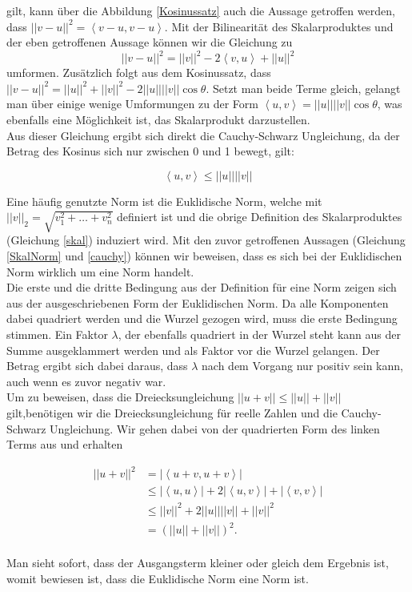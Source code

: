 gilt, kann über die Abbildung \ref{Kosinussatz} auch die Aussage getroffen werden, dass $||v-u||^2 = \left\langle v-u,v-u\right\rangle $. Mit der Bilinearität des Skalarproduktes und der eben getroffenen Aussage können wir die Gleichung zu 
\begin{equation*}
||v-u||^2 = ||v||^2 - 2\left\langle v,u\right\rangle  + ||u||^2 
\end{equation*}
umformen.
Zusätzlich folgt aus dem Kosinussatz, dass $||v-u||^2 = ||u||^2 + ||v||^2 - 2 ||u|| ||v|| \cos\theta$. Setzt man beide Terme gleich, gelangt man über einige wenige Umformungen zu der Form $\left\langle u,v\right\rangle  = ||u|| ||v|| \cos\theta$, was ebenfalls eine Möglichkeit ist, das Skalarprodukt darzustellen.\\
Aus dieser Gleichung ergibt sich direkt die Cauchy-Schwarz Ungleichung, da der Betrag des Kosinus sich nur zwischen 0 und 1 bewegt, gilt:

\begin{equation}
\left\langle u,v\right\rangle  \leq ||u|| ||v||
\label{cauchy}
\end{equation}


Eine häufig genutzte Norm ist die Euklidische Norm, welche mit $||v||_2 = \sqrt{v_1^2 + \dots + v_n^2}$ definiert ist und die obrige Definition des Skalarproduktes (Gleichung \ref{skal}) induziert wird. Mit den zuvor getroffenen Aussagen (Gleichung \ref{SkalNorm} und \ref{cauchy}) können wir beweisen, dass es sich bei der Euklidischen Norm wirklich um eine Norm handelt.\\
Die erste und die dritte Bedingung aus der Definition für eine Norm zeigen sich aus der ausgeschriebenen Form der Euklidischen Norm. Da alle Komponenten dabei quadriert werden und die Wurzel gezogen wird, muss die erste Bedingung stimmen. Ein Faktor $\lambda$, der ebenfalls quadriert in der Wurzel steht kann aus der Summe ausgeklammert werden und als Faktor vor die Wurzel gelangen. Der Betrag ergibt sich dabei daraus, dass $\lambda$ nach dem Vorgang nur positiv sein kann, auch wenn es zuvor negativ war.\\
Um zu beweisen, dass die Dreiecksungleichung $||u+v|| \leq ||u|| + ||v||$  gilt,benötigen wir die Dreiecksungleichung für reelle Zahlen und die Cauchy-Schwarz Ungleichung. Wir gehen dabei von der quadrierten Form des linken Terms aus und erhalten

\begin{align*}
||u+v||^2 &= |\left\langle u+v,u+v\right\rangle|\\
&\leq |\left\langle u,u\right\rangle| + 2|\left\langle u,v\right\rangle| + |\left\langle v,v\right\rangle|\\
&\leq ||v||^2 + 2||u|| ||v|| + ||v||^2\\
&= (||u|| + ||v||)^2.\\
\end{align*}

Man sieht sofort, dass der Ausgangsterm kleiner oder gleich dem Ergebnis ist, womit bewiesen ist, dass die Euklidische Norm eine Norm ist.

%